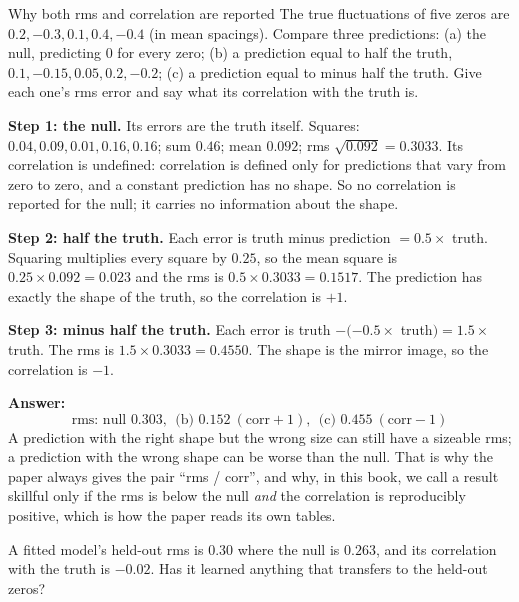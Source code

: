 \begin{sample}{Why both rms and correlation are reported}
The true fluctuations of five zeros are $0.2, -0.3, 0.1, 0.4, -0.4$ (in mean spacings). Compare three predictions: (a) the null, predicting $0$ for every zero; (b) a prediction equal to half the truth, $0.1, -0.15, 0.05, 0.2, -0.2$; (c) a prediction equal to minus half the truth. Give each one's rms error and say what its correlation with the truth is.

\textbf{Step 1: the null.} Its errors are the truth itself. Squares: $0.04, 0.09, 0.01, 0.16, 0.16$; sum $0.46$; mean $0.092$; rms $\sqrt{0.092} = 0.3033$. Its correlation is undefined: correlation is defined only for predictions that vary from zero to zero, and a constant prediction has no shape. So no correlation is reported for the null; it carries no information about the shape.

\textbf{Step 2: half the truth.} Each error is truth minus prediction $= 0.5\times$ truth. Squaring multiplies every square by $0.25$, so the mean square is $0.25 \times 0.092 = 0.023$ and the rms is $0.5 \times 0.3033 = 0.1517$. The prediction has exactly the shape of the truth, so the correlation is $+1$.

\textbf{Step 3: minus half the truth.} Each error is truth $-(-0.5\times$ truth$) = 1.5\times$ truth. The rms is $1.5\times0.3033 = 0.4550$. The shape is the mirror image, so the correlation is $-1$.

\textbf{Answer:}
\[
\boxed{\text{rms: null } 0.303,\ \ \text{(b) } 0.152 \ (\text{corr} +1),\ \ \text{(c) } 0.455\ (\text{corr} -1)}
\]
A prediction with the right shape but the wrong size can still have a sizeable rms; a prediction with the wrong shape can be worse than the null. That is why the paper always gives the pair ``rms / corr'', and why, in this book, we call a result skillful only if the rms is below the null \emph{and} the correlation is reproducibly positive, which is how the paper reads its own tables.
\end{sample}

\begin{checkpoint}
A fitted model's held-out rms is $0.30$ where the null is $0.263$, and its correlation with the truth is $-0.02$. Has it learned anything that transfers to the held-out zeros?
\end{checkpoint}

